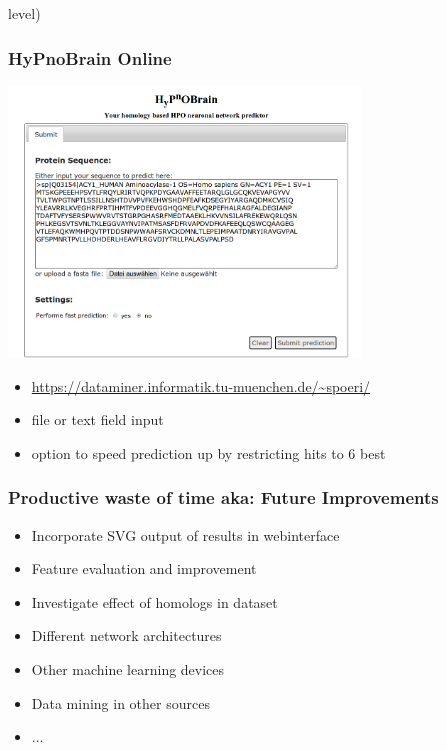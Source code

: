 \documentclass{beamer}
\begin{document}
level)

\begin{frame}[fragile]
	\frametitle{HyPnoBrain Online}
\begin{center}
\includegraphics[width=0.7\textwidth]{webinterface.png}
\end{center}

\begin{itemize}
	\item \url{https://dataminer.informatik.tu-muenchen.de/~spoeri/}
	\item file or text field input
	\item option to speed prediction up by restricting hits to 6 best
\end{itemize}

\end{frame}

\begin{frame}
	\frametitle{Productive waste of time aka: Future Improvements}
	\begin{itemize}
		\item Incorporate SVG output of results in webinterface
		\item Feature evaluation and improvement
		\item Investigate effect of homologs in dataset
		\item Different network architectures 
		\item Other machine learning devices
		\item Data mining in other sources
		\item $\dots$
	\end{itemize}		
	
\end{frame}
\end{document}
